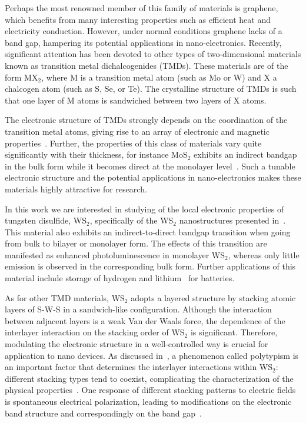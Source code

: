 


Perhaps the most renowned member of this family of materials is graphene,
which benefits from many interesting properties such as efficient heat and electricity conduction.
%
However, under normal conditions graphene lacks of a band gap, hampering its potential
applications in nano-electronics.
%
Recently, significant attention has been devoted to other types
of two-dimensional materials known as  transition metal dichalcogenides (TMDs).
%
These materials are of the form MX$_2$, where M is a 
transition metal atom (such as Mo or W) and X a chalcogen atom (such as S, Se, or Te). 
%
The crystalline structure of TMDs is such that
one layer of M atoms is sandwiched between two layers of X atoms.

The electronic structure of TMDs strongly depends on the coordination 
of the transition metal atoms, giving rise to an array of electronic
and magnetic properties~\cite{Chhowalla:2013}.
%
Further, the properties of this class of materials vary quite significantly
with their thickness, for instance MoS$_2$ exhibits an indirect bandgap
in the bulk form while it becomes direct at the monolayer level~\cite{Splendiani:2010}.
%
Such a tunable electronic structure and the potential applications in
nano-electronics makes these materials highly attractive for research. 

In this work we are interested in studying of the local electronic
properties of tungsten disulfide, WS$_2$, specifically of the
WS$_2$ nanostructures presented in~\cite{SabryaWS2}.
%
This material also exhibits an indirect-to-direct bandgap transition when going
from bulk to bilayer or monolayer form.
%
The effects of this transition are manifested as enhanced
photoluminescence in monolayer WS$_2$, whereas only little emission is observed in
the corresponding bulk form.
%
Further applications of this material include storage of hydrogen 
and lithium~\cite{Bhandavat:2012} for batteries.

As for other TMD materials, WS$_2$ adopts a layered structure 
by stacking atomic layers of S-W-S in a sandwich-like configuration. 
%
Although the interaction between adjacent layers is a weak Van der Waals 
force, the dependence of the interlayer interaction on the stacking 
order of WS$_2$ is significant.
%
Therefore, modulating the electronic
structure in a well-controlled way is crucial for application to
nano devices.
%
As discussed in~\cite{SabryaWS2},
a phenomenon called polytypism is an important factor that determines the interlayer
interactions within WS$_2$: different stacking types tend to coexist, 
complicating the characterization of the physical properties~\cite{Na:2018}.
%
One response of different stacking patterns to electric fields is
spontaneous electrical polarization, leading to modifications on the 
electronic band structure and correspondingly on the band gap~\cite{Li:2016}.

